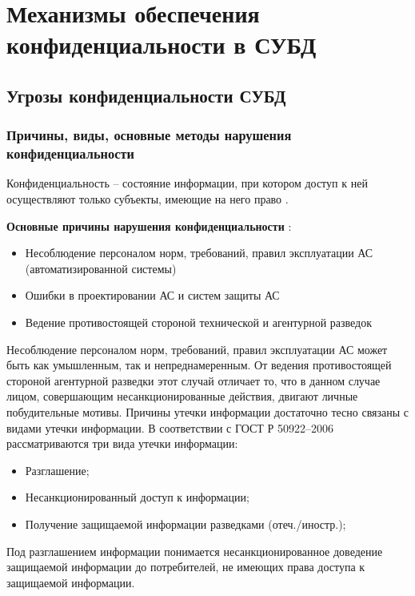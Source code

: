 \section{Механизмы обеспечения конфиденциальности в СУБД}
\subsection{Угрозы конфиденциальности СУБД}

\subsubsection{Причины, виды, основные методы нарушения конфиденциальности}

Конфиденциальность – состояние информации, при котором доступ к ней осуществляют только субъекты,
имеющие на него право \cite{crypto-methods} .

\textbf {Основные причины нарушения конфиденциальности} \cite{o-salo}:
\begin{itemize}
    \item Несоблюдение персоналом норм, требований, правил эксплуатации АС (автоматизированной системы)
    \item Ошибки в проектировании АС и систем защиты АС
    \item Ведение противостоящей стороной технической и агентурной разведок
\end{itemize}

Несоблюдение персоналом норм, требований, правил эксплуатации АС может быть как умышленным, так и непреднамеренным.
От ведения противостоящей стороной агентурной разведки этот случай отличает то, что в данном случае лицом, совершающим
несанкционированные действия, двигают личные побудительные мотивы.
Причины утечки информации достаточно тесно связаны с видами утечки информации.
В соответствии с ГОСТ Р 50922–2006 \cite{GOST50922} рассматриваются три вида утечки информации:

\begin{itemize}
    \item Разглашение;
    \item Несанкционированный доступ к информации;
    \item Получение защищаемой информации разведками (отеч./иностр.);
\end{itemize}

Под разглашением информации понимается несанкционированное доведение защищаемой информации до потребителей, не имеющих
права доступа к защищаемой информации.

